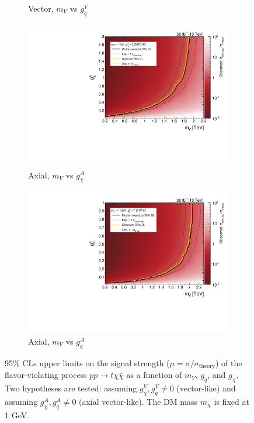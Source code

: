 \begin{figure}[]
\begin{center}
\begin{subfigure}[t]{0.49\textwidth}
            \caption{Vector, $m_V$ vs $g_q^V$}
        \end{subfigure}
        \begin{subfigure}[t]{0.49\textwidth}
            \includegraphics[width=\textwidth]{figures/monotop/results/fcnc2d_obs_gdma_mV.pdf}
            \caption{Axial, $m_V$ vs $g_\chi^A$}
        \end{subfigure}
        \begin{subfigure}[t]{0.49\textwidth}
            \includegraphics[width=\textwidth]{figures/monotop/results/fcnc2d_obs_gqa_mV.pdf}
            \caption{Axial, $m_V$ vs $g_q^A$}
        \end{subfigure}
        \caption{95\% CLs upper limits on the signal strength ($\mu=\sigma/\sigma_\mathrm{theory}$) of the flavor-violating process $pp \rightarrow t \chi\bar\chi$ as a function of $m_V$, $g_q$, and $g_\chi$. 
                 Two hypotheses are tested: assuming $g_\chi^V,g_q^V \neq 0$ (vector-like) and assuming $g_\chi^A,g_q^A\neq0$ (axial vector-like).
                 The DM mass $m_\chi$ is fixed at 1 GeV. }
        \label{fig:mt:fcnc_obs_mg}
    \end{center}
\end{figure}

